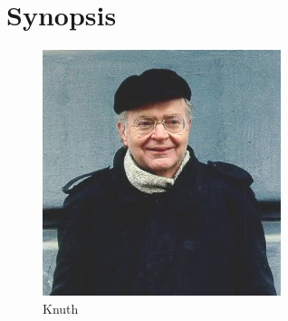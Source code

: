 \chapter*{Synopsis}


\begin{figure}
    \centering
    \includegraphics[width=0.6\linewidth]{images/knuth}
    \caption{Knuth}
    \label{fig:my_label3}
\end{figure}